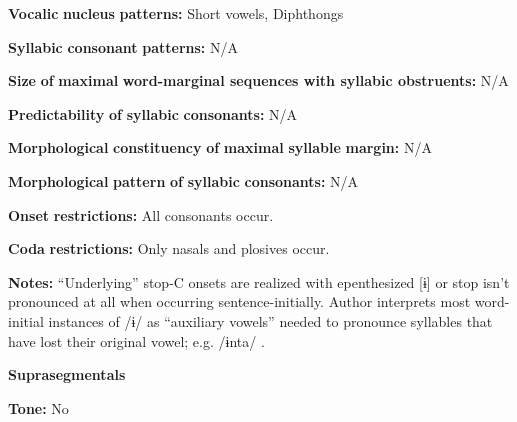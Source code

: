 \documentclass[output=paper]{langsci/langscibook}
\begin{document}
\begin{styleBody}
\textbf{Vocalic} \textbf{nucleus} \textbf{patterns:} Short vowels, Diphthongs
\end{styleBody}

\begin{styleBody}
\textbf{Syllabic} \textbf{consonant} \textbf{patterns:} N/A
\end{styleBody}

\begin{styleBody}
\textbf{Size} \textbf{of} \textbf{maximal} \textbf{word{}-marginal sequences with syllabic obstruents:} N/A
\end{styleBody}

\begin{styleBody}
\textbf{Predictability} \textbf{of} \textbf{syllabic} \textbf{consonants:} N/A
\end{styleBody}

\begin{styleBody}
\textbf{Morphological} \textbf{constituency} \textbf{of} \textbf{maximal} \textbf{syllable} \textbf{margin:} N/A
\end{styleBody}

\begin{styleBody}
\textbf{Morphological} \textbf{pattern} \textbf{of} \textbf{syllabic} \textbf{consonants:} N/A
\end{styleBody}

\begin{styleBody}
\textbf{Onset} \textbf{restrictions:} All consonants occur.
\end{styleBody}

\begin{styleBody}
\textbf{Coda} \textbf{restrictions:} Only nasals and plosives occur.
\end{styleBody}

\begin{styleBody}
\textbf{Notes:} “Underlying” stop-C onsets are realized with epenthesized [ɨ] or stop isn’t pronounced at all when occurring sentence-initially. Author interprets most word-initial instances of /ɨ/ as “auxiliary vowels” needed to pronounce syllables that have lost their original vowel; e.g. /ɨnta/ \citep[26]{Courtz2008}.
\end{styleBody}

\begin{styleBody}
\textbf{Suprasegmentals}
\end{styleBody}

\begin{styleBody}
\textbf{Tone:} No
\end{styleBody}
\end{document}

